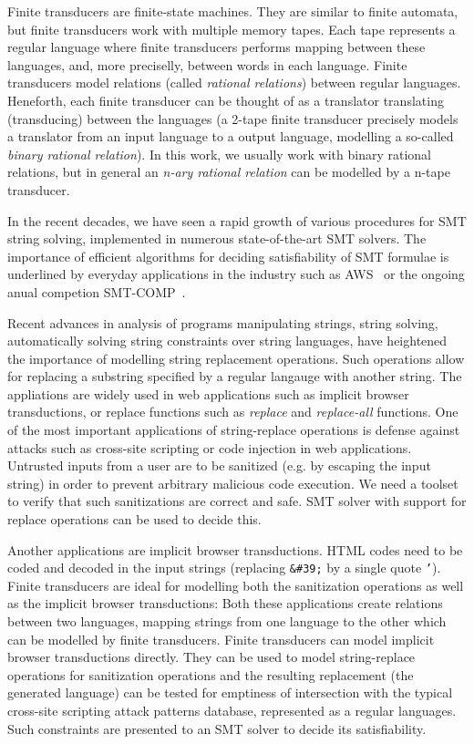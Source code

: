 Finite transducers are finite-state machines.
They are similar to finite automata, but finite transducers work with multiple memory tapes.
Each tape represents a regular language where finite transducers performs mapping between these languages, and, more preciselly, between words in each language.
Finite transducers model relations (called \emph{rational relations}) between regular languages.
Heneforth, each finite transducer can be thought of as a translator translating (transducing) between the languages (a 2-tape finite transducer precisely models a translator from an input language to a output language, modelling a so-called \emph{binary rational relation}).
In this work, we usually work with binary rational relations, but in general an \emph{n-ary rational relation} can be modelled by a n-tape transducer.

In the recent decades, we have seen a rapid growth of  various procedures for SMT string solving, implemented in numerous state-of-the-art SMT solvers.
The importance of efficient algorithms for deciding satisfiability of SMT formulae is underlined by everyday applications in the industry such as AWS~\cite{Rungta2022} or the ongoing anual competion SMT-COMP~\cite{smt_comp}.

Recent advances in analysis of programs manipulating strings, string solving, automatically solving string constraints over string languages, have heightened the importance of modelling string replacement operations.
Such operations allow for replacing a substring specified by a regular langauge with another string.
The appliations are widely used in web applications such as implicit browser transductions, or replace functions such as \emph{replace} and \emph{replace-all} functions.
One of the most important applications of string-replace operations is defense against attacks such as cross-site scripting or code injection in web applications.
Untrusted inputs from a user are to be sanitized (e.g. by escaping the input string) in order to prevent arbitrary malicious code execution.
We need a toolset to verify that such sanitizations are correct and safe.
SMT solver with support for replace operations can be used to decide this.

Another applications are implicit browser transductions.
HTML codes need to be coded and decoded in the input strings (replacing \texttt{\&\#39;} by a single quote \texttt{'}).
Finite transducers are ideal for modelling both the sanitization operations as well as the implicit browser transductions:
Both these applications create relations between two languages, mapping strings from one language to the other which can be modelled by finite transducers.
Finite transducers can model implicit browser transductions directly.
They can be used to model string-replace operations for sanitization operations and the resulting replacement (the generated language) can be tested for emptiness of intersection with the typical cross-site scripting attack patterns database, represented as a regular languages.
Such constraints are presented to an SMT solver to decide its satisfiability.


